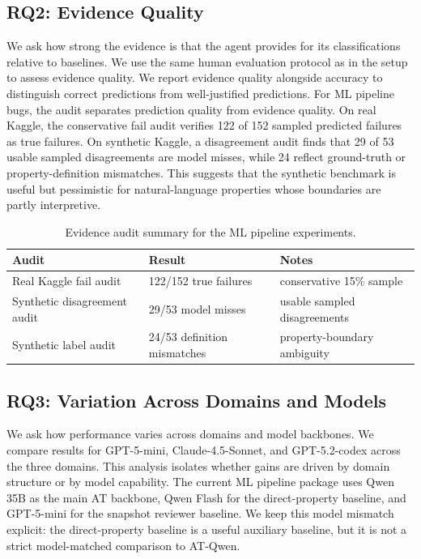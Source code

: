 \documentclass{article}
\theoremstyle{plain}
\theoremstyle{definition}
\theoremstyle{remark}
\begin{document}
\subsection{RQ2: Evidence Quality}
We ask how strong the evidence is that the agent provides for its classifications relative to baselines.
We use the same human evaluation protocol as in the setup to assess evidence quality.
We report evidence quality alongside accuracy to distinguish correct predictions from well-justified predictions.
For ML pipeline bugs, the audit separates prediction quality from evidence quality.
On real Kaggle, the conservative fail audit verifies 122 of 152 sampled predicted failures as true failures.
On synthetic Kaggle, a disagreement audit finds that 29 of 53 usable sampled disagreements are model misses, while 24 reflect ground-truth or property-definition mismatches.
This suggests that the synthetic benchmark is useful but pessimistic for natural-language properties whose boundaries are partly interpretive.

\begin{table}[t]
  \centering
  \caption{Evidence audit summary for the ML pipeline experiments.}
  \label{tab:rq2}
  \begin{tabular}{lll}
    \toprule
    Audit & Result & Notes \\
    \midrule
    Real Kaggle fail audit & 122/152 true failures & conservative 15\% sample \\
    Synthetic disagreement audit & 29/53 model misses & usable sampled disagreements \\
    Synthetic label audit & 24/53 definition mismatches & property-boundary ambiguity \\
    \bottomrule
  \end{tabular}
\end{table}

\subsection{RQ3: Variation Across Domains and Models}
We ask how performance varies across domains and model backbones.
We compare results for GPT-5-mini, Claude-4.5-Sonnet, and GPT-5.2-codex across the three domains.
This analysis isolates whether gains are driven by domain structure or by model capability.
The current ML pipeline package uses Qwen 35B as the main AT backbone, Qwen Flash for the direct-property baseline, and GPT-5-mini for the snapshot reviewer baseline.
We keep this model mismatch explicit: the direct-property baseline is a useful auxiliary baseline, but it is not a strict model-matched comparison to AT-Qwen.
\end{document}

